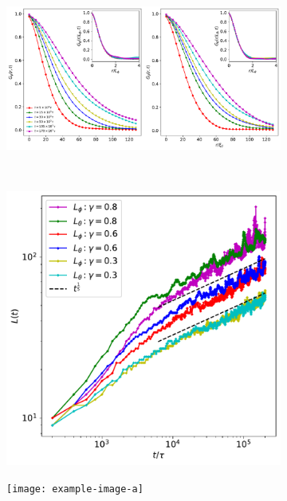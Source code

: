 \begin{figure}
    \begin{subfigure}{\textwidth}
        \centering
        \includegraphics[width=\textwidth]{
            gfx/ch-twoCompDynamics/correlations.pdf}
        \caption{}
        \label{fig:correlation-functions}
    \end{subfigure}\\
    \begin{subfigure}{0.5\textwidth}
        \centering
        \includegraphics[width=\textwidth]{
            gfx/ch-twoCompDynamics/correlation_lengths.pdf}
        \caption{}
        \label{fig:correlation-lengths}
    \end{subfigure}
    \begin{subfigure}{0.5\textwidth}
        \centering
        \texttt{[image: example-image-a]}
        \caption{}
        \label{fig:scalar-vortex-lengths}
    \end{subfigure}
    \caption{}
\end{figure}
